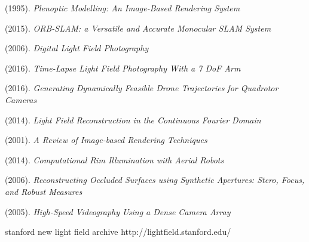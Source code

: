 \documentclass[12pt]{report}
\begin{document}
\begin{thebibliography}{10}
	(1995). \emph{Plenoptic Modelling: An Image-Based Rendering System}

	(2015). \emph{ORB-SLAM: a Versatile and Accurate Monocular SLAM System}

	(2006). \emph{Digital Light Field Photography}	

	(2016). \emph{Time-Lapse Light Field Photography With a 7 DoF Arm}

	(2016). \emph{Generating Dynamically Feasible Drone Trajectories for Quadrotor Cameras}

	(2014). \emph{Light Field Reconstruction in the Continuous Fourier Domain}

	(2001). \emph{A Review of Image-based Rendering Techniques}

	(2014). \emph{Computational Rim Illumination with Aerial Robots}

	(2006). \emph{Reconstructing Occluded Surfaces using Synthetic Apertures: Stero, Focus, and Robust Measures} 
	
	(2005). \emph{High-Speed Videography Using a Dense Camera Array}

	stanford new light field archive http://lightfield.stanford.edu/

\end{thebibliography}
\end{document}
